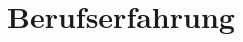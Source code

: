 \documentclass[11pt,a4paper,]{awesome-cv}
\begin{document}
\makecvheader







\hypertarget{berufserfahrung}{%
\section{Berufserfahrung}\label{berufserfahrung}}
\end{document}

